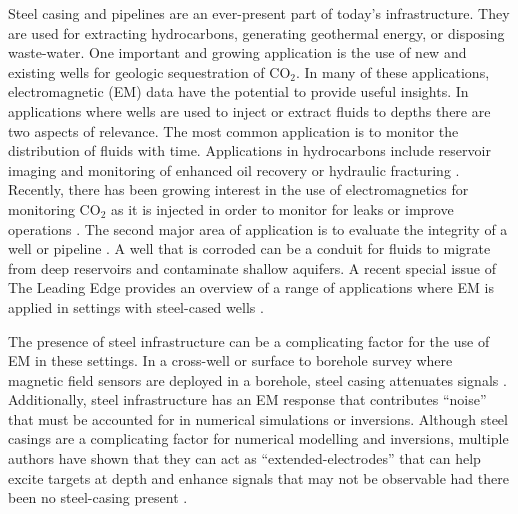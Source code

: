 \documentclass[onecolumn, extra, mreferee]{gji}
\begin{document}
Steel casing and pipelines are an ever-present part of today's infrastructure. They are used for extracting hydrocarbons, generating geothermal energy, or disposing waste-water. One important and growing application is the use of new and existing wells for geologic sequestration of CO$_2$. In many of these applications, electromagnetic (EM) data have the potential to provide useful insights. In applications where wells are used to inject or extract fluids to depths there are two aspects of relevance. The most common application is to monitor the distribution of fluids with time. Applications in hydrocarbons include reservoir imaging and monitoring of enhanced oil recovery or hydraulic fracturing \citep{Rocroi1985, Pardo2008a, tang_three-dimensional_2015, hoversten_hydro-frac_2015, Tietze2015}. Recently, there has been growing interest in the use of electromagnetics for monitoring CO$_2$ as it is injected in order to monitor for leaks or improve operations \citep{carrigan_electrical_2013, park_25d_2017, puzyrev_three-dimensional_2017, um_joint_2020}. The second major area of application is to evaluate the integrity of a well or pipeline \cite{wilt_casing_2020, beskardes_effects_2021}. A well that is corroded can be a conduit for fluids to migrate from deep reservoirs and contaminate shallow aquifers. A recent special issue of The Leading Edge provides an overview of a range of applications where EM is applied in settings with steel-cased wells \citep{weiss_introduction_2022}.

The presence of steel infrastructure can be a complicating factor for the use of EM in these settings. In a cross-well or surface to borehole survey where magnetic field sensors are deployed in a borehole, steel casing attenuates signals \citep{augustin_theoretical_1989, Wu1994, Wilt1996, cuevas_analytical_2014}. Additionally, steel infrastructure has an EM response that contributes ``noise'' that must be accounted for in numerical simulations or inversions. Although steel casings are a complicating factor for numerical modelling and inversions, multiple authors have shown that they can act as ``extended-electrodes'' that can help excite targets at depth and enhance signals that may not be observable had there been no steel-casing present \citep{schenkel_electrical_1994, hoversten_hydro-frac_2015, yang_3d_2016, puzyrev_three-dimensional_2017}.
\end{document}
